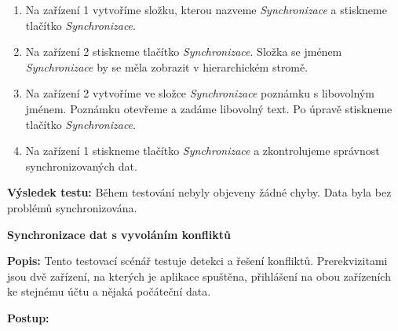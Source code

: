 \documentclass[czech, bc, kiv, he, iso690numb]{fasthesis}
\begin{document}
\begin{enumerate}[label=\arabic*., itemsep=0pt, topsep=0pt, parsep=0pt]
    \item Na zařízení 1 vytvoříme složku, kterou nazveme \textit{Synchronizace} a stiskneme tlačítko \textit{Synchronizace}.
    \item Na zařízení 2 stiskneme tlačítko \textit{Synchronizace}. Složka se jménem \textit{Synchronizace} by se měla zobrazit v hierarchickém stromě.
    \item Na zařízení 2 vytvoříme ve složce \textit{Synchronizace} poznámku s libovolným jménem. Poznámku otevřeme a zadáme libovolný text. Po úpravě stiskneme tlačítko \textit{Synchronizace}.
    \item Na zařízení 1 stiskneme tlačítko \textit{Synchronizace} a zkontrolujeme správnost synchronizovaných dat.
\end{enumerate}

\noindent \textbf{Výsledek testu:} Během testování nebyly objeveny žádné chyby. Data byla bez problémů synchronizována.

\vspace{0.1cm}


\noindent \textbf{Synchronizace dat s vyvoláním konfliktů}

\vspace{0.1cm}

\noindent \textbf{Popis:} Tento testovací scénář testuje detekci a řešení konfliktů. Prerekvizitami jsou dvě zařízení, na kterých je aplikace spuštěna, přihlášení na obou zařízeních ke stejnému účtu a nějaká počáteční data.  

\vspace{0.1cm}

\noindent \textbf{Postup:}
\end{document}
